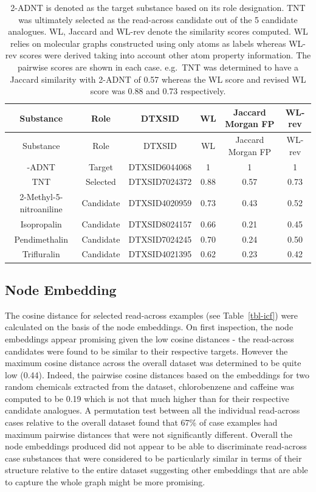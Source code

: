 \documentclass[
  super,
  preprint,
  3p]{elsarticle}
\begin{document}
\begin{longtable}[]{@{}cccccc@{}}
\caption{2-ADNT is denoted as the target substance based on its role
designation. TNT was ultimately selected as the read-across candidate
out of the 5 candidate analogues. WL, Jaccard and WL-rev denote the
similarity scores computed. WL relies on molecular graphs constructed
using only atoms as labels whereas WL-rev scores were derived taking
into account other atom property information. The pairwise scores are
shown in each case. e.g.~TNT was determined to have a Jaccard similarity
with 2-ADNT of 0.57 whereas the WL score and revised WL score was 0.88
and 0.73 respectively.}\label{tbl-pprtv}\tabularnewline
\toprule\noalign{}
Substance & Role & DTXSID & WL & Jaccard Morgan FP & WL-rev \\
\midrule\noalign{}
\endfirsthead
\toprule\noalign{}
Substance & Role & DTXSID & WL & Jaccard Morgan FP & WL-rev \\
\midrule\noalign{}
\endhead
\bottomrule\noalign{}
\endlastfoot
2-ADNT & Target & DTXSID6044068 & 1 & 1 & 1 \\
TNT & Selected & DTXSID7024372 & 0.88 & 0.57 & 0.73 \\
2-Methyl-5-nitroaniline & Candidate & DTXSID4020959 & 0.73 & 0.43 &
0.52 \\
Isopropalin & Candidate & DTXSID8024157 & 0.66 & 0.21 & 0.45 \\
Pendimethalin & Candidate & DTXSID7024245 & 0.70 & 0.24 & 0.50 \\
Trifluralin & Candidate & DTXSID4021395 & 0.62 & 0.23 & 0.42 \\
\end{longtable}

\subsection{Node Embedding}\label{node-embedding}

The cosine distance for selected read-across examples (see
Table~\ref{tbl-icf}) were calculated on the basis of the node
embeddings. On first inspection, the node embeddings appear promising
given the low cosine distances - the read-across candidates were found
to be similar to their respective targets. However the maximum cosine
distance across the overall dataset was determined to be quite low
(0.44). Indeed, the pairwise cosine distances based on the embeddings
for two random chemicals extracted from the dataset, chlorobenzene and
caffeine was computed to be 0.19 which is not that much higher than for
their respective candidate analogues. A permutation test between all the
individual read-across cases relative to the overall dataset found that
67\% of case examples had maximum pairwise distances that were not
significantly different. Overall the node embeddings produced did not
appear to be able to discriminate read-across case substances that were
considered to be particularly similar in terms of their structure
relative to the entire dataset suggesting other embeddings that are able
to capture the whole graph might be more promising.
\end{document}

